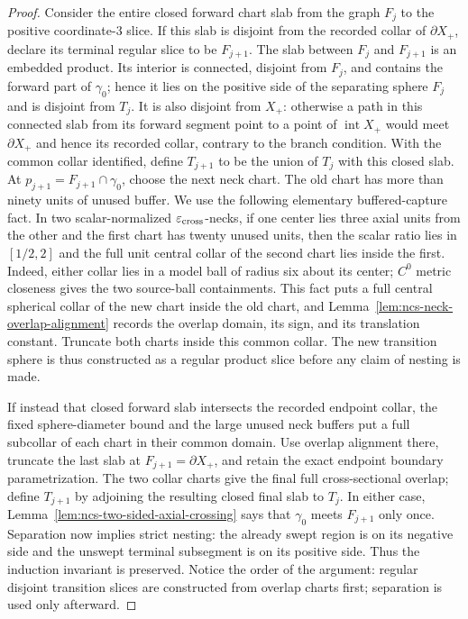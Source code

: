 \documentclass[10pt]{coll-l}
\theoremstyle{definition}
\theoremstyle{remark}
\numberwithin{section}{chapter}
\numberwithin{equation}{chapter}
\begin{document}
\begin{proof}
Consider the entire closed forward chart slab from the graph $F_j$ to the
positive coordinate-$3$ slice.  If this slab is disjoint from the recorded
collar of $\partial X_+$, declare its terminal regular slice to be
$F_{j+1}$.  The slab between $F_j$ and $F_{j+1}$ is an embedded product.
Its interior is connected,
disjoint from $F_j$, and contains the forward part of $\gamma_0$; hence it
lies on the positive side of the separating sphere $F_j$ and is disjoint
from $T_j$.  It is also disjoint from $X_+$: otherwise a path in this
connected slab from its forward segment point to a point of
$\operatorname{int}X_+$ would meet $\partial X_+$ and hence its recorded
collar, contrary to the branch condition.  With the common collar
identified, define
$T_{j+1}$ to be the union of $T_j$ with this closed slab.  At
$p_{j+1}=F_{j+1}\cap\gamma_0$, choose the next neck chart.  The old chart
has more than ninety units of unused buffer.  We use the following elementary
buffered-capture fact.  In two scalar-normalized
$\varepsilon_{\rm cross}$-necks, if one center lies three axial units from
the other and the first chart has twenty unused units, then the scalar ratio
lies in $[1/2,2]$ and the full unit central collar of the second chart lies
inside the first.  Indeed, either collar lies in a model ball of radius six
about its center; $C^0$ metric closeness gives the two source-ball
containments.  This fact puts a full central spherical collar of the new
chart inside the old chart, and Lemma~\ref{lem:ncs-neck-overlap-alignment} records the
overlap domain, its sign, and its translation constant.  Truncate both
charts inside this common collar.  The new transition sphere is thus
constructed as a regular product slice before any claim of nesting is
made.

If instead that closed forward slab intersects the recorded endpoint
collar, the fixed sphere-diameter bound and the large unused neck buffers
put a full subcollar of each chart in their common domain.  Use overlap
alignment there, truncate the last slab at
$F_{j+1}=\partial X_+$, and retain the exact endpoint boundary
parametrization.  The two collar charts give the final full
cross-sectional overlap; define
$T_{j+1}$ by adjoining the resulting closed final slab to $T_j$.  In either
case, Lemma~\ref{lem:ncs-two-sided-axial-crossing} says that $\gamma_0$
meets $F_{j+1}$ only once.  Separation now implies strict nesting: the
already swept region is on its negative side and the unswept terminal
subsegment is on its positive side.  Thus the induction invariant is
preserved.  Notice the order of the argument: regular disjoint transition
slices are constructed from overlap charts first; separation is used only
afterward.


\end{proof}
\end{document}
